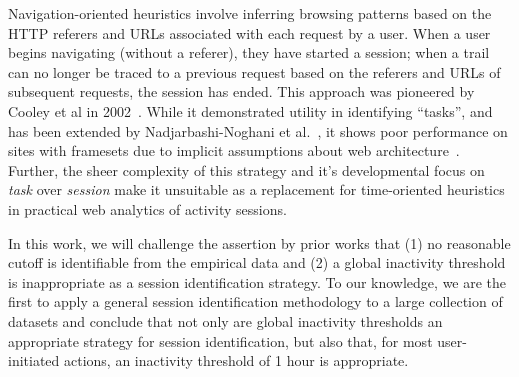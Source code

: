 Navigation-oriented heuristics involve inferring browsing patterns based on the HTTP referers and URLs associated with each request by a user. When a user begins navigating (without a referer), they have started a session; when a trail can no longer be traced to a previous request based on the referers and URLs of subsequent requests, the session has ended.  This approach was pioneered by Cooley et al in 2002~\cite{cooley1999data}.  While it demonstrated utility in identifying ``tasks'', and has been extended by Nadjarbashi-Noghani et al.~\cite{nadjarbashi2004improving}, it shows poor performance on sites with framesets due to implicit assumptions about web architecture~\cite{berendt2003impact}. Further, the sheer complexity of this strategy and it's developmental focus on \emph{task} over \emph{session} make it unsuitable as a replacement for time-oriented heuristics in practical web analytics of activity sessions.

In this work, we will challenge the assertion by prior works that (1) no reasonable cutoff is identifiable from the empirical data and (2) a global inactivity threshold is inappropriate as a session identification strategy.  To our knowledge, we are the first to apply a general session identification methodology to a large collection of datasets and conclude that not only are global inactivity thresholds an appropriate strategy for session identification, but also that, for most user-initiated actions, an inactivity threshold of 1 hour is appropriate.

